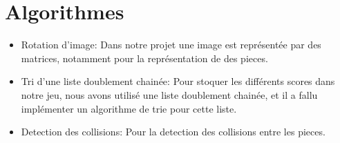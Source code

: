 \section{Algorithmes}\label{algorithmes}

\begin{itemize}
    \item Rotation d'image: 
        Dans notre projet une image est représentée par des matrices, notamment pour la représentation de des pieces.
    \item Tri d'une liste doublement chainée: 
        Pour stoquer les différents scores dans notre jeu, nous avons utilisé une liste doublement chainée, et il
        a fallu implémenter un algorithme de trie pour cette liste.
    \item Detection des collisions: Pour la detection des collisions entre les pieces.
\end{itemize}